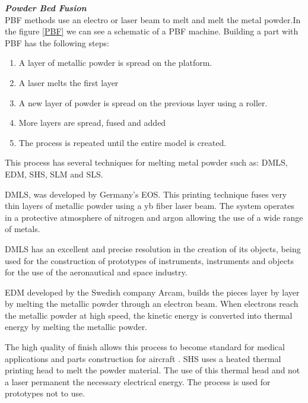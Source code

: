 \vspace{50}
\textbf{\emph{Powder Bed Fusion}}\\
\vspace{5}
\ac{PBF} methods use an electro or laser beam to melt and melt the metal powder.In the figure \ref{PBF} we can see a schematic of a \ac{PBF} machine. Building a part with \ac{PBF} has the following steps:
\begin{enumerate}
    \item A layer of metallic powder is spread on the platform.
    \item A laser melts the first layer
    \item A new layer of powder is spread on the previous layer using a roller.
    \item More layers are spread, fused and added
    \item The process is repeated until the entire model is created.
\end{enumerate}

This process has several techniques for melting metal powder such as: DMLS, EDM, SHS, SLM and SLS.\par

DMLS, was developed by Germany's EOS. This printing technique fuses very thin layers of metallic powder using a yb fiber laser beam. The system operates in a protective atmosphere of nitrogen and argon allowing the use of a wide range of metals. \cite{udroiu2012powder}\par
DMLS has an excellent and precise resolution in the creation of its objects, being used for the construction of prototypes of instruments, instruments and objects for the use of the aeronautical and space industry. \cite{3dilla}\par
EDM developed by the Swedish company Arcam, builds the pieces layer by layer by melting the metallic powder through an electron beam. When electrons reach the metallic powder at high speed, the kinetic energy is converted into thermal energy by melting the metallic powder. \cite{udroiu2012powder}\par
The high quality of finish allows this process to become standard for medical applications and parts construction for aircraft \cite{lboropbf}.
SHS uses a heated thermal printing head to melt the powder material. The use of this thermal head and not a laser permanent the necessary electrical energy. The process is used for prototypes not to use. \cite{lboropbf}\par

